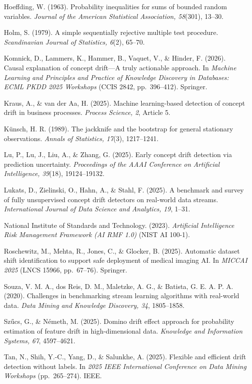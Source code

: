 \documentclass[
]{article}
\begin{document}
Hoeffding, W. (1963). Probability inequalities for sums of bounded
random variables. \emph{Journal of the American Statistical Association,
58}(301), 13--30.

Holm, S. (1979). A simple sequentially rejective multiple test
procedure. \emph{Scandinavian Journal of Statistics, 6}(2), 65--70.

Komnick, D., Lammers, K., Hammer, B., Vaquet, V., \& Hinder, F. (2026).
Causal explanation of concept drift---A truly actionable approach. In
\emph{Machine Learning and Principles and Practice of Knowledge
Discovery in Databases: ECML PKDD 2025 Workshops} (CCIS 2842,
pp.~396--412). Springer.

Kraus, A., \& van der Aa, H. (2025). Machine learning-based detection of
concept drift in business processes. \emph{Process Science, 2}, Article
5.

Künsch, H. R. (1989). The jackknife and the bootstrap for general
stationary observations. \emph{Annals of Statistics, 17}(3), 1217--1241.

Lu, P., Lu, J., Liu, A., \& Zhang, G. (2025). Early concept drift
detection via prediction uncertainty. \emph{Proceedings of the AAAI
Conference on Artificial Intelligence, 39}(18), 19124--19132.

Lukats, D., Zielinski, O., Hahn, A., \& Stahl, F. (2025). A benchmark
and survey of fully unsupervised concept drift detectors on real-world
data streams. \emph{International Journal of Data Science and Analytics,
19}, 1--31.

National Institute of Standards and Technology. (2023). \emph{Artificial
Intelligence Risk Management Framework (AI RMF 1.0)} (NIST AI 100-1).

Roschewitz, M., Mehta, R., Jones, C., \& Glocker, B. (2025). Automatic
dataset shift identification to support safe deployment of medical
imaging AI. In \emph{MICCAI 2025} (LNCS 15966, pp.~67--76). Springer.

Souza, V. M. A., dos Reis, D. M., Maletzke, A. G., \& Batista, G. E. A.
P. A. (2020). Challenges in benchmarking stream learning algorithms with
real-world data. \emph{Data Mining and Knowledge Discovery, 34},
1805--1858.

Szűcs, G., \& Németh, M. (2025). Domino drift effect approach for
probability estimation of feature drift in high-dimensional data.
\emph{Knowledge and Information Systems, 67}, 4597--4621.

Tan, N., Shih, Y.-C., Yang, D., \& Salunkhe, A. (2025). Flexible and
efficient drift detection without labels. In \emph{2025 IEEE
International Conference on Data Mining Workshops} (pp.~265--274). IEEE.
\end{document}
